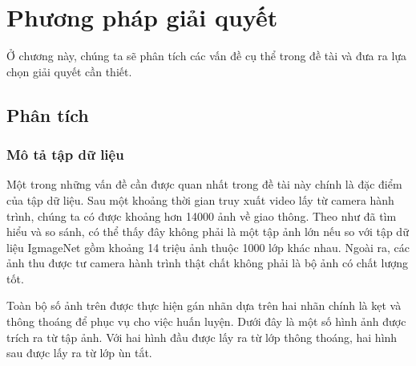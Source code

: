 \chapter{Phương pháp giải quyết}
Ở chương này, chúng ta sẽ phân tích các vấn đề cụ thể trong đề tài và đưa ra lựa chọn giải quyết cần thiết.\par 
\section{Phân tích}
	\subsection{Mô tả tập dữ liệu}
	Một trong những vấn đề cần được quan nhất trong đề tài này chính là đặc điểm của tập dữ liệu. Sau một khoảng thời gian truy xuất video lấy từ camera hành trình, chúng ta có được khoảng hơn 14000 ảnh về giao thông. Theo như đã tìm hiểu và so sánh, có thể thấy đây không phải là một tập ảnh lớn nếu so với tập dữ liệu IgmageNet gồm khoảng 14 triệu ảnh thuộc 1000 lớp khác nhau. Ngoài ra, các ảnh thu được tư camera hành trình thật chất không phải là bộ ảnh có chất lượng tốt.\par 
	Toàn bộ số ảnh trên được thực hiện gán nhãn dựa trên hai nhãn chính là kẹt và thông thoáng để phục vụ cho việc huấn luyện. Dưới đây là một số hình ảnh được trích ra từ tập ảnh. Với hai hình đầu được lấy ra từ lớp thông thoáng, hai hình sau được lấy ra từ lớp ùn tắt.
